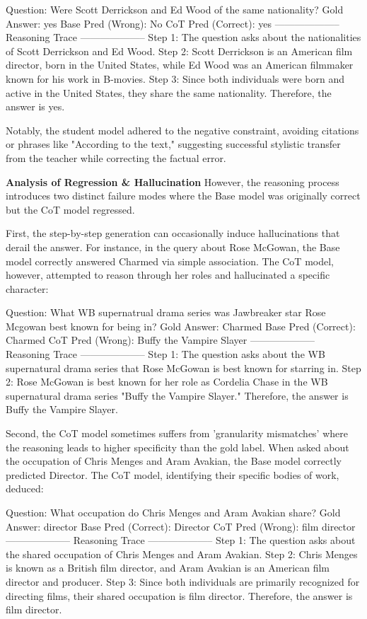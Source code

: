 \documentclass{article}
\begin{document}
Question: Were Scott Derrickson and Ed Wood of the same nationality?
Gold Answer: yes
Base Pred (Wrong): No
CoT Pred (Correct): yes
-------------------- Reasoning Trace --------------------
Step 1: The question asks about the nationalities of Scott Derrickson and Ed Wood.  
Step 2: Scott Derrickson is an American film director, born in the United States, while Ed Wood was an American filmmaker known for his work in B-movies.  
Step 3: Since both individuals were born and active in the United States, they share the same nationality. Therefore, the answer is yes.

Notably, the student model adhered to the negative constraint, avoiding citations or phrases like "According to the text," suggesting successful stylistic transfer from the teacher while correcting the factual error.

\textbf{Analysis of Regression \& Hallucination} However, the reasoning process introduces two distinct failure modes where the Base model was originally correct but the CoT model regressed.

First, the step-by-step generation can occasionally induce hallucinations that derail the answer. For instance, in the query about Rose McGowan, the Base model correctly answered Charmed via simple association. The CoT model, however, attempted to reason through her roles and hallucinated a specific character:

Question: What WB supernatrual drama series was Jawbreaker star Rose Mcgowan best known for being in?
Gold Answer: Charmed
Base Pred (Correct): Charmed
CoT Pred (Wrong): Buffy the Vampire Slayer
-------------------- Reasoning Trace --------------------
Step 1: The question asks about the WB supernatural drama series that Rose McGowan is best known for starring in.  
Step 2: Rose McGowan is best known for her role as Cordelia Chase in the WB supernatural drama series "Buffy the Vampire Slayer."  
Therefore, the answer is Buffy the Vampire Slayer.


Second, the CoT model sometimes suffers from 'granularity mismatches' where the reasoning leads to higher specificity than the gold label. When asked about the occupation of Chris Menges and Aram Avakian, the Base model correctly predicted Director. The CoT model, identifying their specific bodies of work, deduced:

Question: What occupation do Chris Menges and Aram Avakian share?
Gold Answer: director
Base Pred (Correct): Director
CoT Pred (Wrong): film director
-------------------- Reasoning Trace --------------------
Step 1: The question asks about the shared occupation of Chris Menges and Aram Avakian.  
Step 2: Chris Menges is known as a British film director, and Aram Avakian is an American film director and producer.  
Step 3: Since both individuals are primarily recognized for directing films, their shared occupation is film director. Therefore, the answer is film director.
\end{document}

